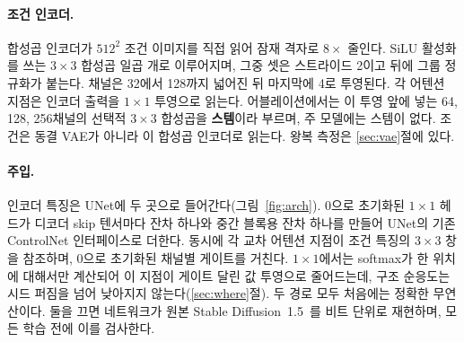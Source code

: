 \documentclass[10pt,twocolumn,a4paper]{article}
\begin{document}


\paragraph{조건 인코더.} 합성곱 인코더가 $512^2$ 조건 이미지를 직접 읽어 잠재 격자로
$8\times$ 줄인다. SiLU 활성화를 쓰는 $3{\times}3$ 합성곱 일곱 개로 이루어지며, 그중 셋은
스트라이드 2이고 뒤에 그룹 정규화가 붙는다. 채널은 32에서 128까지 넓어진 뒤 마지막에 4로
투영된다. 각 어텐션 지점은 인코더 출력을 $1{\times}1$ 투영으로 읽는다. 어블레이션에서는 이
투영 앞에 넣는 64, 128, 256채널의 선택적 $3{\times}3$ 합성곱을 \textbf{스템}이라 부르며, 주
모델에는 스템이 없다. 조건은 동결 VAE가 아니라 이 합성곱 인코더로 읽는다. 왕복 측정은
\ref{sec:vae}절에 있다.

\paragraph{주입.} 인코더 특징은 UNet에 두 곳으로 들어간다(그림~\ref{fig:arch}). 0으로
초기화된 $1{\times}1$ 헤드가 디코더 skip 텐서마다 잔차 하나와 중간 블록용 잔차 하나를 만들어
UNet의 기존 ControlNet 인터페이스로 더한다. 동시에 각 교차 어텐션 지점이 조건 특징의
$3{\times}3$ 창을 참조하며, 0으로 초기화된 채널별 게이트를 거친다. $1{\times}1$에서는
softmax가 한 위치에 대해서만 계산되어 이 지점이 게이트 달린 값 투영으로 줄어드는데, 구조
순응도는 시드 퍼짐을 넘어 낮아지지 않는다(\ref{sec:where}절). 두 경로 모두 처음에는 정확한
무연산이다. 둘을 끄면 네트워크가 원본 Stable Diffusion~1.5~\cite{rombach2021high}를 비트
단위로 재현하며, 모든 학습 전에 이를 검사한다.



\end{document}
